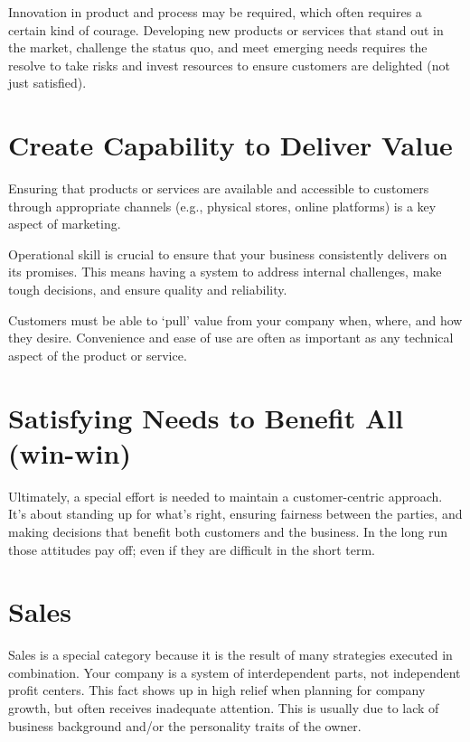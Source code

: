 \documentclass[
]{book}
\begin{document}
Innovation in product and process may be required, which often requires a certain kind of courage. Developing new products or services that stand out in the market, challenge the status quo, and meet emerging needs requires the resolve to take risks and invest resources to ensure customers are delighted (not just satisfied).

\hypertarget{create-capability-to-deliver-value}{%
\section{\texorpdfstring{\textbf{Create Capability to Deliver Value}}{Create Capability to Deliver Value}}\label{create-capability-to-deliver-value}}

Ensuring that products or services are available and accessible to customers through appropriate channels (e.g., physical stores, online platforms) is a key aspect of marketing.

Operational skill is crucial to ensure that your business consistently delivers on its promises. This means having a system to address internal challenges, make tough decisions, and ensure quality and reliability.

Customers must be able to `pull' value from your company when, where, and how they desire. Convenience and ease of use are often as important as any technical aspect of the product or service.

\hypertarget{satisfying-needs-to-benefit-all-win-win}{%
\section{\texorpdfstring{\textbf{Satisfying Needs to Benefit All (win-win)}}{Satisfying Needs to Benefit All (win-win)}}\label{satisfying-needs-to-benefit-all-win-win}}

Ultimately, a special effort is needed to maintain a customer-centric approach. It's about standing up for what's right, ensuring fairness between the parties, and making decisions that benefit both customers and the business. In the long run those attitudes pay off; even if they are difficult in the short term.

\hypertarget{sales}{%
\section{\texorpdfstring{\textbf{Sales}}{Sales}}\label{sales}}

Sales is a special category because it is the result of many strategies executed in combination. Your company is a system of interdependent parts, not independent profit centers. This fact shows up in high relief when planning for company growth, but often receives inadequate attention. This is usually due to lack of business background and/or the personality traits of the owner.
\end{document}
